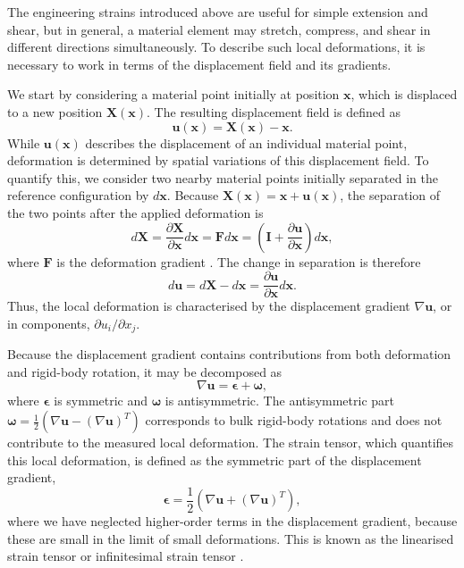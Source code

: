 \documentclass[asymmetricmargins]{library/duthesis}%
\providecommand{\DIFadd}[1]{{\protect\color{blue}\uwave{#1}}} %
\providecommand{\DIFaddbegin}{} %
\providecommand{\DIFaddend}{} %
\begin{document}
The engineering strains introduced above are useful for simple extension and shear, but in general, a material element may stretch, compress, and shear in different directions simultaneously. To describe such local deformations, it is necessary to work in terms of the displacement field and its gradients.

We start by considering a material point initially at position $\bm{x}$, which is displaced to a new position $\bm{X}(\bm{x})$. The resulting displacement field is defined as
\[
    \bm{u}(\bm{x}) = \bm{X}(\bm{x}) - \bm{x}.
\]
While $\bm{u}(\bm{x})$ describes the displacement of an individual material point, deformation is determined by spatial variations of this displacement field. To quantify this, we consider two nearby material points initially separated in the reference configuration by $d\bm{x}$. Because $\bm{X}(\bm{x}) = \bm{x} + \bm{u}(\bm{x})$, the separation of the two points after the applied deformation is
\[
    d\bm{X} = \frac{\partial \bm{X}}{\partial \bm{x}} d\bm{x} = \bm{F} d\bm{x} = \left( \bm{I} + \frac{\partial \bm{u}}{\partial \bm{x}} \right) d\bm{x},
\]
where $\bm{F}$ is the deformation gradient \DIFaddbegin \DIFadd{and $\bm{I}$ is the identity tensor}\DIFaddend . The change in separation is therefore
\[
    d\bm{u} = d\bm{X} - d\bm{x} = \frac{\partial \bm{u}}{\partial \bm{x}} d\bm{x}.
\]
Thus, the local deformation is characterised by the displacement gradient $\nabla \bm{u}$, or in components, $\partial u_i/\partial x_j$.

Because the displacement gradient contains contributions from both deformation and rigid-body rotation, it may be decomposed as 
\[
    \nabla \bm{u} = \bm{\epsilon} + \bm{\omega},
\]
where $\bm{\epsilon}$ is symmetric and $\bm{\omega}$ is antisymmetric. The antisymmetric part $\bm{\omega} = \frac{1}{2}\left( \nabla \bm{u} - (\nabla \bm{u})^T \right)$ corresponds to bulk rigid-body rotations and does not contribute to the measured local deformation. The strain tensor, which quantifies this local deformation, is defined as the symmetric part of the displacement gradient,
\begin{equation}
\bm{\epsilon} = \frac{1}{2}\left( \nabla \bm{u} + (\nabla \bm{u})^T \right),
\label{eq:linearStrain}
\end{equation}
where we have neglected higher-order terms in the displacement gradient, because these are small in the limit of small deformations. This is known as the linearised strain tensor or infinitesimal strain tensor \cite{chandrasekharaiahContinuumMechanics2014}.
\end{document}
